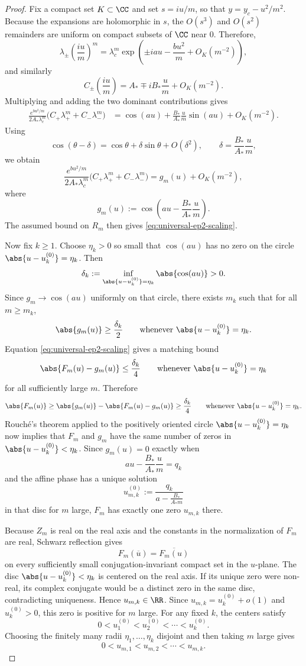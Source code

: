 \begin{proof}
Fix a compact set \(K\subset\CC\) and set \(s=iu/m\), so that \(y=y_c-u^2/m^2\).
Because the expansions are holomorphic in \(s\), the \(O(s^3)\) and \(O(s^2)\) remainders are uniform on compact subsets of \(\CC\) near \(0\).
Therefore,
\[
\lambda_\pm\!\left(\frac{iu}{m}\right)^m
=
\lambda_c^m
\exp\!\left(
\pm iau-\frac{bu^2}{m}+O_K(m^{-2})
\right),
\]
and similarly
\[
C_\pm\!\left(\frac{iu}{m}\right)
=
A_*\mp iB_*\frac{u}{m}+O_K(m^{-2}).
\]
Multiplying and adding the two dominant contributions gives
\begin{align*}
\frac{e^{b u^2/m}}{2A_*\lambda_c^m}
\bigl(C_+\lambda_+^m + C_-\lambda_-^m\bigr)
&=
\cos(au)+\frac{B_*}{A_*}\frac{u}{m}\sin(au)+O_K(m^{-2}).
\end{align*}
Using
\[
\cos(\theta-\delta)=\cos\theta+\delta\sin\theta+O(\delta^2),
\qquad
\delta=\frac{B_*}{A_*}\frac{u}{m},
\]
we obtain
\[
\frac{e^{b u^2/m}}{2A_*\lambda_c^m}
\bigl(C_+\lambda_+^m + C_-\lambda_-^m\bigr)
=
g_m(u)+O_K(m^{-2}),
\]
where
\[
g_m(u):=\cos\!\left(a u-\frac{B_*}{A_*}\frac{u}{m}\right).
\]
The assumed bound on \(R_m\) then gives \eqref{eq:universal-ep2-scaling}.

Now fix \(k\ge1\).
Choose \(\eta_k>0\) so small that \(\cos(au)\) has no zero on the circle \(\abs{u-u_k^{(0)}}=\eta_k\).
Then
\[
\delta_k:=\inf_{\abs{u-u_k^{(0)}}=\eta_k}\abs{\cos(au)}>0.
\]
Since \(g_m\to \cos(au)\) uniformly on that circle, there exists \(m_k\) such that for all \(m\ge m_k\),
\[
\abs{g_m(u)}\ge \frac{\delta_k}{2}
\qquad
\text{whenever }\abs{u-u_k^{(0)}}=\eta_k.
\]
Equation \eqref{eq:universal-ep2-scaling} gives a matching bound
\[
\abs{F_m(u)-g_m(u)}\le \frac{\delta_k}{4}
\qquad
\text{whenever }\abs{u-u_k^{(0)}}=\eta_k
\]
for all sufficiently large \(m\).
Therefore
\[
\abs{F_m(u)}\ge \abs{g_m(u)}-\abs{F_m(u)-g_m(u)}\ge \frac{\delta_k}{4}
\qquad
\text{whenever }\abs{u-u_k^{(0)}}=\eta_k.
\]
Rouch\'e's theorem applied to the positively oriented circle \(\abs{u-u_k^{(0)}}=\eta_k\) now implies that \(F_m\) and \(g_m\) have the same number of zeros in \(\abs{u-u_k^{(0)}}<\eta_k\).
Since \(g_m(u)=0\) exactly when
\[
au-\frac{B_*}{A_*}\frac{u}{m}=q_k
\]
and the affine phase has a unique solution
\[
u_{m,k}^{(0)}:=\frac{q_k}{a-\frac{B_*}{A_*m}}
\]
in that disc for \(m\) large, \(F_m\) has exactly one zero \(u_{m,k}\) there.

Because \(Z_m\) is real on the real axis and the constants in the normalization of \(F_m\) are real, Schwarz reflection gives
\[
F_m(\overline u)=\overline{F_m(u)}
\]
on every sufficiently small conjugation-invariant compact set in the \(u\)-plane.
The disc \(\abs{u-u_k^{(0)}}<\eta_k\) is centered on the real axis.
If its unique zero were non-real, its complex conjugate would be a distinct zero in the same disc, contradicting uniqueness.
Hence \(u_{m,k}\in\RR\).
Since \(u_{m,k}=u_k^{(0)}+o(1)\) and \(u_k^{(0)}>0\), this zero is positive for \(m\) large.
For any fixed \(k\), the centers satisfy
\[
0<u_1^{(0)}<u_2^{(0)}<\cdots<u_k^{(0)}.
\]
Choosing the finitely many radii \(\eta_1,\ldots,\eta_k\) disjoint and then taking \(m\) large gives
\[
0<u_{m,1}<u_{m,2}<\cdots<u_{m,k}.
\]


\end{proof}
